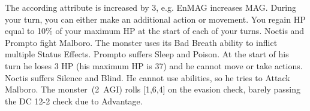 %
 The according attribute is increased by 3, e.g. EnMAG increases MAG. \ofgap
%
 During your turn, you can either make an additional action or movement. \ofgap
%
 You regain HP equal to 10\% of your maximum HP at the start of each of your turns.
%
\vfill
%
{
	Noctis and Prompto fight Malboro. 
	The monster uses its Bad Breath ability to inflict multiple Status Effects.
	Prompto suffers Sleep and Poison.
	At the start of his turn he loses 3 HP (his maximum HP is 37) and he cannot move or take actions.
	Noctis suffers Silence and Blind.
	He cannot use abilities, so he tries to Attack Malboro. 
	The monster~(2~AGI) rolls [1,6,4] on the evasion check, barely passing the DC 12-2 check due to Advantage.
}
%
\clearpage

